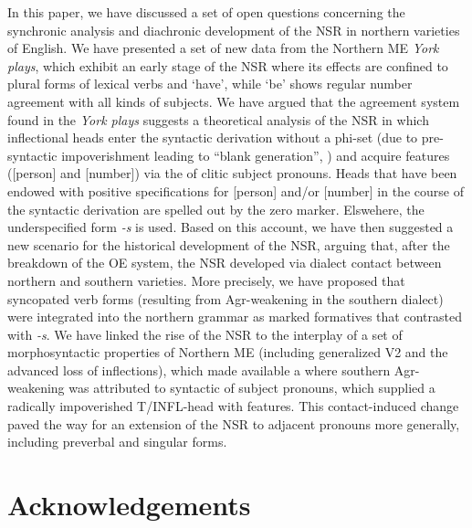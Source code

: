 \documentclass[output=paper]{langsci/langscibook}
\begin{document}
In this paper, we have discussed a set of open questions concerning the
synchronic analysis and diachronic development of the \gls{NSR} in northern varieties
of English. We have presented a set of new data from the Northern ME
\emph{York plays}, which exhibit an early stage of the \gls{NSR} where its effects
are confined to plural forms of lexical verbs and `have', while `be' shows
regular number agreement with all kinds of subjects. We have argued that the
agreement system found in the \emph{York plays} suggests a theoretical
analysis of the \gls{NSR} in which inflectional heads enter the syntactic derivation
without a phi-set (due to pre-syntactic impoverishment leading to ``blank
generation'', \citealt{Roberts:2010}) and acquire  features ([person] and
[number]) via the  of clitic subject pronouns. Heads that have
been endowed with positive specifications for [person] and/or [number] in the
course of the syntactic derivation are spelled out by the zero marker.
Elswehere, the underspecified form \emph{-s} is used. Based on this account,
we have then suggested a new scenario for the historical development
of the \gls{NSR}, arguing that, after the breakdown of the \gls{OE}  system, the
\gls{NSR} developed via dialect contact between northern and southern varieties. More
precisely, we have proposed that syncopated verb forms (resulting from
Agr-weakening in the southern dialect) were integrated into the northern
grammar as marked  formatives that contrasted with \emph{-s}. We
have linked the rise of the \gls{NSR} to the interplay of a set of morphosyntactic
properties of Northern \gls{ME} (including generalized V2 and the advanced loss of
inflections), which made available a  where southern Agr-weakening
was attributed to syntactic  of subject pronouns, which supplied a
radically impoverished T/INFL-head with  features.
This contact-induced change paved the way for an extension of the
\gls{NSR} to adjacent pronouns more generally,
including preverbal and singular forms.

\printchapterglossary{}

\section*{Acknowledgements}
\end{document}
